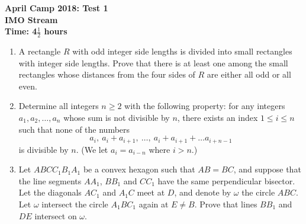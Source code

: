 \documentclass[a4paper,12pt, titlepage]{article}
\begin{document}
\setcounter{page}{1}

\begin{center}
	\textbf{April Camp 2018: Test 1}\\
	\textbf{IMO Stream}\\
	\textbf{Time: 4$\frac{1}{2}$ hours}
\end{center}

\begin{enumerate}
\vspace{0.2cm}

\item %

A rectangle $R$ with odd integer side lengths is divided into small rectangles with integer side lengths. Prove that there is at least one among the small rectangles whose distances from the four sides of $R$ are either all odd or all even.\\

\item %

Determine all integers $n \geq 2$ with the following property: for any integers $a_1, a_2, \dots, a_n$ whose sum is not divisible by $n$, there exists an index $1 \leq i \leq n$ such that none of the numbers $$a_i, \ a_i+a_{i+1}, \ \dots, \ a_i+a_{i+1}+\dots a_{i+n-1}$$ is divisible by $n$. (We let $a_i = a_{i-n}$ where $i>n$.)\\



\item %

Let $ABCC_1B_1A_1$ be a convex hexagon such that $AB = BC$, and suppose that the line segments $AA_1$, $BB_1$ and $CC_1$ have the same perpendicular bisector. Let the diagonals $AC_1$ and $A_1C$ meet at $D$, and denote by $\omega$ the circle $ABC$. Let $\omega$ intersect the circle $A_1BC_1$ again at $E \neq B$. Prove that lines $BB_1$ and $DE$ intersect on $\omega$.

\end{enumerate}
\end{document}

